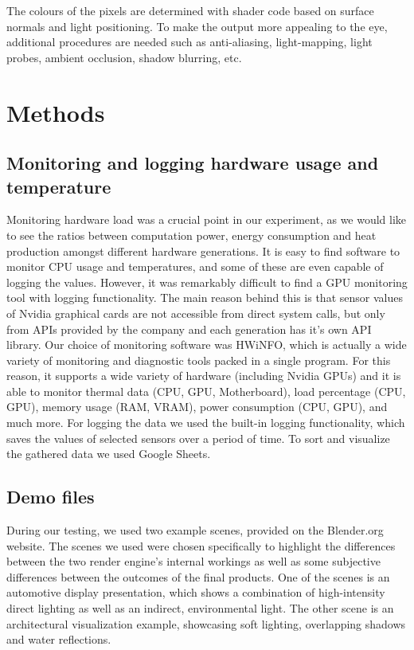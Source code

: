 \documentclass[conference]{IEEEtran}
\begin{document}
The colours of the pixels are determined with shader code based on surface normals and light positioning.  To make the output more appealing to the eye, additional procedures are needed such as anti-aliasing, light-mapping, light probes, ambient occlusion, shadow blurring, etc.

\section{Methods}

\subsection{Monitoring and logging hardware usage and temperature}
    Monitoring hardware load was a crucial point in our experiment, as we would like to see the ratios between computation power, energy consumption and heat production amongst different hardware generations. It is easy to find software to monitor CPU usage and temperatures, and some of these are even capable of logging the values. However, it was remarkably difficult to find a GPU monitoring tool with logging functionality. The main reason behind this is that sensor values of Nvidia graphical cards are not accessible from direct system calls,\cite{nvapiStack} but only from APIs provided by the company and each generation has it's own API library.\cite{nvapi}
    Our choice of monitoring software was HWiNFO, which is actually a wide variety of monitoring and diagnostic tools packed in a single program. For this reason, it supports a wide variety of hardware (including Nvidia GPUs) and it is able to monitor thermal data (CPU, GPU, Motherboard), load percentage (CPU, GPU), memory usage (RAM, VRAM), power consumption (CPU, GPU), and much more. For logging the data we used the built-in logging functionality, which saves the values of selected sensors over a period of time. \cite{hwinfo} To sort and visualize the gathered data we used Google Sheets. 
   
    

\subsection{Demo files}\label{Demo}
    During our testing, we used two example scenes, provided on the Blender.org website. The scenes we used were chosen specifically to highlight the differences between the two render engine's internal workings as well as some subjective differences between the outcomes of the final products. One of the scenes is an automotive display presentation\cite{mikeBMWscene}, which shows a combination of high-intensity direct lighting as well as an indirect, environmental light. The other scene is an architectural visualization\cite{claudio2013archviz} example, showcasing soft lighting, overlapping shadows and water reflections. 
\end{document}
